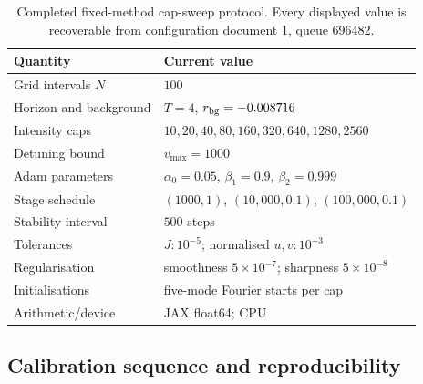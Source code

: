 \documentclass[9pt,a4paper,twocolumn,twoside]{rho-class/rho}
\begin{document}
        \begin{table}[H]
            \caption{Completed fixed-method cap-sweep protocol. Every displayed value is recoverable from configuration document 1, queue 696482.}
            \label{tab:numerical-protocol}
            \setlength{\tabcolsep}{3pt}
            \begin{tabular}{>{\raggedright\arraybackslash}p{}>{\raggedright\arraybackslash}p{}}
                \toprule
                \textbf{Quantity} & \textbf{Current value} \\
                \midrule
                Grid intervals $N$ & $100$ \\
                Horizon and background & $T=4$, $r_{\rm bg}=-0.008716$ \\
                Intensity caps & $10,20,40,80,160,$\newline $320,640,1280,2560$ \\
                Detuning bound & $v_{\max}=1000$ \\
                Adam parameters & $\alpha_0=0.05$, $\beta_1=0.9$, $\beta_2=0.999$ \\
                Stage schedule & $(1000,1)$, $(10{,}000,0.1)$, $(100{,}000,0.1)$ \\
                Stability interval & $500$ steps \\
                Tolerances & $J:10^{-5}$; normalised $u,v:10^{-3}$ \\
                Regularisation & smoothness $5\times10^{-7}$; sharpness $5\times10^{-8}$ \\
                Initialisations & 50 five-mode Fourier starts per cap \\
                Arithmetic/device & JAX float64; CPU \\
                \bottomrule
            \end{tabular}
        \end{table}

    \subsection{Calibration sequence and reproducibility}
\end{document}
